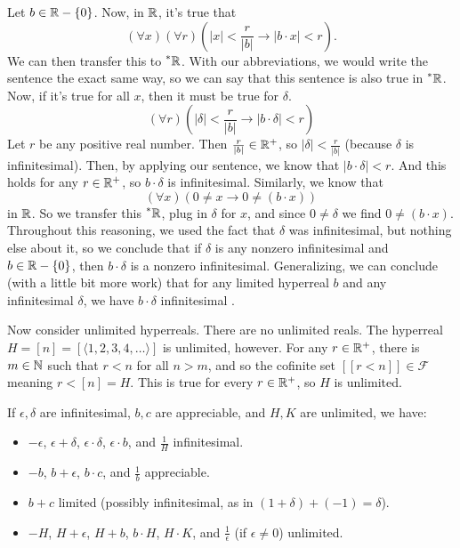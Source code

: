 Let $b \in \mathbb{R} - \{0\}$. Now, in $\mathbb{R}$, it's true that
\[
(\forall x)(\forall r)\left( |x| < \frac{r}{|b|} \to |b \cdot x| < r \right).
\] 
We can then transfer this to $\prescript{*}{}{\mathbb{R}}$. With our abbreviations, we would write the sentence the exact same way, so we can say that this sentence is also true in $\prescript{*}{}{\mathbb{R}}$. Now, if it's true for all $x$, then it must be true for $\delta$.
\[
(\forall r)\left(|\delta| < \frac{r}{|b|} \to |b \cdot \delta| < r \right)
\]
Let $r$ be any positive real number. Then $\frac{r}{|b|} \in \mathbb{R}^+$, so $|\delta| < \frac{r}{|b|}$ (because $\delta$ is infinitesimal). Then, by applying our sentence, we know that $|b \cdot \delta| < r$. And this holds for any $r \in \mathbb{R}^+$, so $b \cdot \delta$ is infinitesimal. Similarly, we know that
\[
(\forall x)(0 \neq x \to 0 \neq (b \cdot x))
\]
in $\mathbb{R}$. So we transfer this $\prescript{*}{}{\mathbb{R}}$, plug in $\delta$ for $x$, and since $0 \neq \delta$ we find $0 \neq (b \cdot x)$. Throughout this reasoning, we used the fact that $\delta$ was infinitesimal, but nothing else about it, so we conclude that if $\delta$ is any nonzero infinitesimal and $b \in \mathbb{R} - \{0\}$, then $b \cdot \delta$ is a nonzero infinitesimal. Generalizing, we can conclude (with a little bit more work) that for any limited hyperreal $b$ and any infinitesimal $\delta$, we have $b \cdot \delta$ infinitesimal \cite[Chapter~5.2]{goldblatt1998}.

Now consider unlimited hyperreals. There are no unlimited reals. The hyperreal $H = [n] = [\langle 1, 2, 3, 4, \ldots \rangle]$ is unlimited, however. For any $r \in \mathbb{R}^+$, there is $m \in \mathbb{N}$ such that $r < n$ for all $n > m$, and so the cofinite set $[[r < n]] \in \mathcal{F}$ meaning $r < [n] = H$. This is true for every $r \in \mathbb{R}^+$, so $H$ is unlimited.

\begin{thm}\label{arithmeticHyperreals}
    If $\epsilon, \delta$ are infinitesimal, $b, c$ are appreciable, and $H, K$ are unlimited, we have:
    \begin{itemize}
        \item $-\epsilon$, $\epsilon + \delta$, $\epsilon \cdot \delta$, $\epsilon \cdot b$, and $\frac{1}{H}$ infinitesimal.
        \item $-b$, $b + \epsilon$, $b \cdot c$, and $\frac{1}{b}$ appreciable.
        \item $b + c$ limited (possibly infinitesimal, as in $(1 + \delta) + (-1) = \delta$).
        \item $-H$, $H + \epsilon$, $H + b$, $b \cdot H$, $H \cdot K$, and $\frac{1}{\epsilon}$ (if $\epsilon \neq 0$) unlimited.
    \end{itemize}
\end{thm}


